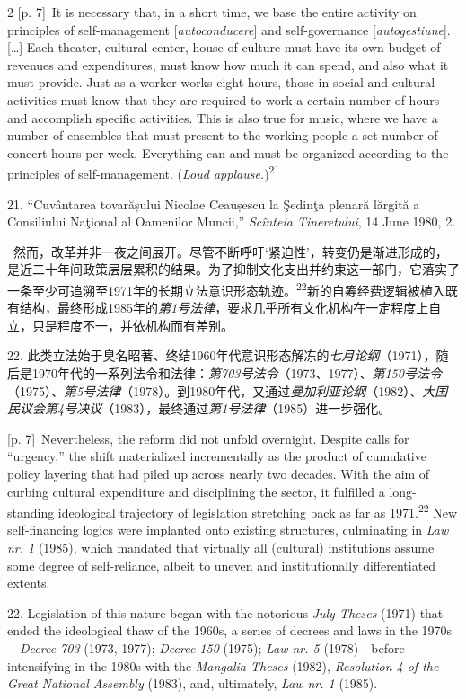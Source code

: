 \documentclass[10pt,a4paper]{article}
\begin{document}
\begin{paracol}{2}
{\scriptsize\color{gray} [p. 7]}\ It is necessary that, in a short time, we base the entire activity on principles of self-management [\textit{autoconducere}] and self-governance [\textit{autogestiune}]. […] Each theater, cultural center, house of culture must have its own budget of revenues and expenditures, must know how much it can spend, and also what it must provide. Just as a worker works eight hours, those in social and cultural activities must know that they are required to work a certain number of hours and accomplish specific activities. This is also true for music, where we have a number of ensembles that must present to the working people a set number of concert hours per week. Everything can and must be organized according to the principles of self-management. (\textit{Loud applause.})\nobreak\textsuperscript{21}\par{\small 21. “Cuvântarea tovarășului Nicolae Ceaușescu la Şedinţa plenară lărgită a Consiliului Naţional al Oamenilor Muncii,” \textit{Scînteia Tineretului}, 14 June 1980, 2.\par}
\switchcolumn*
{\scriptsize\color{gray} [p. 7]}\ 然而，改革并非一夜之间展开。尽管不断呼吁‘紧迫性’，转变仍是渐进形成的，是近二十年间政策层层累积的结果。为了抑制文化支出并约束这一部门，它落实了一条至少可追溯至1971年的长期立法意识形态轨\mbox{迹。\textsuperscript{22}}新的自筹经费逻辑被植入既有结构，最终形成1985年的\textit{第1号法律}，要求几乎所有文化机构在一定程度上自立，只是程度不一，并依机构而有差别。\par{\small 22. 此类立法始于臭名昭著、终结1960年代意识形态解冻的\textit{七月论纲}（1971），随后是1970年代的一系列法令和法律：\textit{第703号法令}（1973、1977）、\textit{第150号法令}（1975）、\textit{第5号法律}（1978）。到1980年代，又通过\textit{曼加利亚论纲}（1982）、\textit{大国民议会第4号决议}（1983），最终通过\textit{第1号法律}（1985）进一步强化。\par}
\switchcolumn
{\scriptsize\color{gray} [p. 7]}\ Nevertheless, the reform did not unfold overnight. Despite calls for “urgency,” the shift materialized incrementally as the product of cumulative policy layering that had piled up across nearly two decades. With the aim of curbing cultural expenditure and disciplining the sector, it fulfilled a long-standing ideological trajectory of legislation stretching back as far as 1971.\nobreak\textsuperscript{22} New self-financing logics were implanted onto existing structures, culminating in \textit{Law nr. 1} (1985), which mandated that virtually all (cultural) institutions assume some degree of self-reliance, albeit to uneven and institutionally differentiated extents.\par{\small 22. Legislation of this nature began with the notorious \textit{July Theses} (1971) that ended the ideological thaw of the 1960s, a series of decrees and laws in the 1970s—\textit{Decree 703} (1973, 1977); \textit{Decree 150} (1975); \textit{Law nr. 5} (1978)—before intensifying in the 1980s with the \textit{Mangalia Theses} (1982), \textit{Resolution 4 of the Great National Assembly} (1983), and, ultimately, \textit{Law nr. 1} (1985).\par}

\end{paracol}
\end{document}
